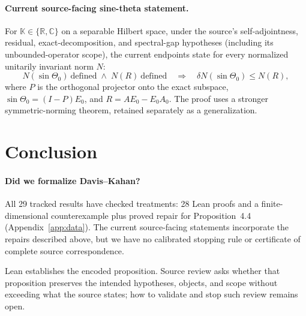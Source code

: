 \documentclass{article}
\begin{document}
\paragraph{Current source-facing sine-theta statement.}
For $\mathbb K\in\{\mathbb R,\mathbb C\}$ on a separable Hilbert space, under
the source's self-adjointness, residual, exact-decomposition, and spectral-gap
hypotheses (including its unbounded-operator scope), the current endpoints state
for every normalized unitarily invariant norm $N$:
\begin{equation}
  N(\sin\Theta_0)\ \text{defined}\;\land\;N(R)\ \text{defined}
  \quad\Longrightarrow\quad
  \delta N(\sin\Theta_0)\le N(R),
  \label{eq:source-facing-sin-theta}
\end{equation}
where $P$ is the orthogonal projector onto the exact subspace,
$\sin\Theta_0=(I-P)E_0$, and $R=AE_0-E_0A_0$.  The proof uses a stronger
symmetric-norming theorem, retained separately as a generalization.


\section{Conclusion}

\paragraph{Did we formalize Davis--Kahan?}
All 29 tracked results have checked treatments: 28 Lean proofs and a
finite-dimensional counterexample plus proved repair for Proposition~4.4
(Appendix~\ref{app:data}).  The current source-facing statements incorporate the
repairs described above, but we have no calibrated stopping rule or certificate
of complete source correspondence.

Lean establishes the encoded proposition.  Source review asks whether that
proposition preserves the intended hypotheses, objects, and scope without
exceeding what the source states; how to validate and stop such review remains
open.
\end{document}
